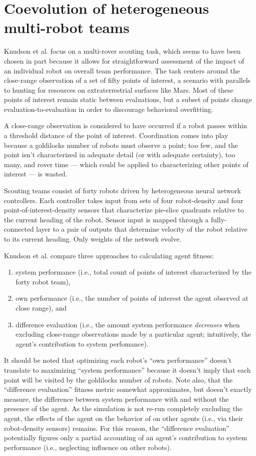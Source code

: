 \section{Coevolution of heterogeneous multi-robot teams \cite{knudson2010coevolution}}

Knudson et al. focus on a multi-rover scouting task, which seems to have been chosen in part because it allows for straightforward assessment of the impact of an individual robot on overall team performance.
The task centers around the close-range observation of a set of fifty points of interest, a scenario with parallels to hunting for resources on extraterrestrial surfaces like Mars.
Most of these points of interest remain static between evaluations, but a subset of points change evaluation-to-evaluation in order to discourage behavioral overfitting.

A close-range observation is considered to have occurred if a robot passes within a threshold distance of the point of interest.
Coordination comes into play because a goldilocks number of robots must observe a point; too few, and the point isn't characterized in adequate detail (or with adequate certainty), too many, and rover time --- which could be applied to characterizing other points of interest --- is wasted.

Scouting teams consist of forty robots driven by heterogeneous neural network controllers.
Each controller takes input from sets of four robot-density and four point-of-interest-density sensors that characterize pie-slice quadrants relative to the current heading of the robot.
Sensor input is mapped through a fully-connected layer to a pair of outputs that determine velocity of the robot relative to its current heading.
Only weights of the network evolve.

Knudson et al. compare three approaches to calculating agent fitness:
\begin{enumerate}
\item system performance (i.e., total count of points of interest characterized by the forty robot team),
\item own performance (i.e., the number of points of interest the agent observed at close range), and
\item difference evaluation (i.e., the amount system performance \textit{decreases} when excluding close-range observations made by a particular agent; intuitively, the agent's contribution to system perfomance).
\end{enumerate}
It should be noted that optimizing each robot's ``own performance'' doesn't translate to maximizing ``system performance'' because it doesn't imply that each point will be visited by the goldilocks number of robots.
Note also, that the ``difference evaluation'' fitness metric somewhat approximates, but doesn't exactly measure, the difference between system performance with and without the presence of the agent.
As the simulation is not re-run completely excluding the agent, the effects of the agent on the behavior of on other agents (i.e., via their robot-density sensors) remains.
For this reason, the ``difference evaluation'' potentially figures only a partial accounting of an agent's contribution to system performance (i.e., neglecting influence on other robots).

